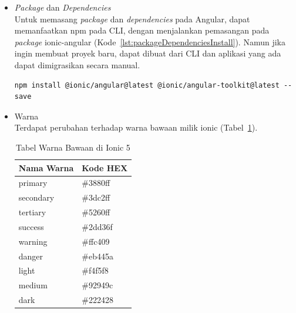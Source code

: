 \begin{enumerate}
\begin{itemize}
		Selain yang sudah disebutkan, terdapat beberapa komponen lain yang mendapat perubahan di Ionic 5, namun tidak ditulis di dalam dokumen skripsi ini. Komponen-komponen tersebut antara lain Action Sheet, Anchor, Card, FAB, Item, Menu Button, Nav Link, Radio, Segment, Segment Button, Skeleton Text, Split Pane, dan Tabs~\footnote{\textit{`Breaking Changes'} https://github.com/ionic-team/ionic-framework/blob/main/BREAKING.md, Diakses pada 20 November 2021. \label{ref:breakingChangesIonic5}}.
		\item {\it Package} dan {\it Dependencies} \\
		Untuk memasang {\it package} dan {\it dependencies} pada Angular, dapat memanfaatkan npm pada CLI, dengan menjalankan pemasangan pada {\it package} ionic-angular  (Kode~\ref{lst:packageDependenciesInstall}). Namun jika ingin membuat proyek baru, dapat dibuat dari CLI dan aplikasi yang ada dapat dimigrasikan secara manual.
\begin{lstlisting}[label={lst:packageDependenciesInstall}, caption=Kode untuk Memasang {\it Package} dan {\it Dependencies} pada Angular]
npm install @ionic/angular@latest @ionic/angular-toolkit@latest --save
\end{lstlisting}
\newpage		
		\item Warna \\
		Terdapat perubahan terhadap warna bawaan milik ionic (Tabel~\ref{table:colors}).
		\begin{table}[H]
		\centering
		\caption{Tabel Warna Bawaan di Ionic 5}
			\begin{tabular}{|l|l|}
				\hline
				Nama Warna & Kode HEX \\ \hline
				primary    & \#3880ff \\ \hline
				secondary  & \#3dc2ff \\ \hline
				tertiary   & \#5260ff \\ \hline
				success    & \#2dd36f \\ \hline
				warning    & \#ffc409 \\ \hline
				danger     & \#eb445a \\ \hline
				light      & \#f4f5f8 \\ \hline
				medium     & \#92949c \\ \hline
				dark       & \#222428 \\ \hline
			\end{tabular}
			\label{table:colors}
		\end{table}
		

\end{itemize}
\end{enumerate}
